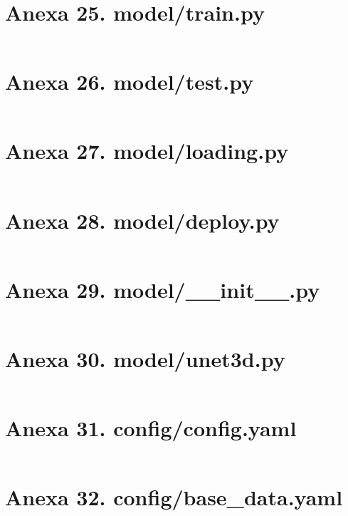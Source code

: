 \section{Anexa 25. model/train.py}
\label{appendix:25_model_train_py}
\inputminted[linenos,tabsize=4,breaklines]{py}{code/python/model/train.py}

\section{Anexa 26. model/test.py}
\label{appendix:26_model_test_py}
\inputminted[linenos,tabsize=4,breaklines]{py}{code/python/model/test.py}

\section{Anexa 27. model/loading.py}
\label{appendix:27_model_loading_py}
\inputminted[linenos,tabsize=4,breaklines]{py}{code/python/model/loading.py}

\section{Anexa 28. model/deploy.py}
\label{appendix:28_model_deploy_py}
\inputminted[linenos,tabsize=4,breaklines]{py}{code/python/model/deploy.py}

\section{Anexa 29. model/\_\_init\_\_.py}
\label{appendix:29_model___init___py}
\inputminted[linenos,tabsize=4,breaklines]{py}{code/python/model/__init__.py}

\section{Anexa 30. model/unet3d.py}
\label{appendix:30_model_unet3d_py}
\inputminted[linenos,tabsize=4,breaklines]{py}{code/python/model/unet3d.py}


\section{Anexa 31. config/config.yaml}
\label{appendix:31_config_config_yaml}
\inputminted[linenos,tabsize=4,breaklines]{yaml}{code/python/config/config.yaml}

\section{Anexa 32. config/base\_data.yaml}
\label{appendix:32_config_base_data_yaml}
\inputminted[linenos,tabsize=4,breaklines]{yaml}{code/python/config/base_data.yaml}


